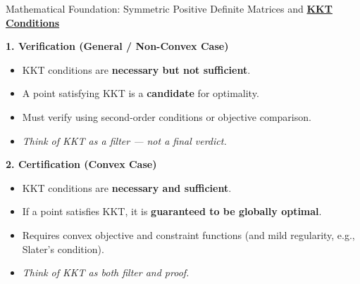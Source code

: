 \documentclass{beamer}
\begin{document}
\begin{frame}{{Mathematical Foundation: Symmetric Positive Definite Matrices and \textbf{\underline{KKT Conditions}}}}

    \textbf{1. Verification (General / Non-Convex Case)}
    \begin{itemize}
        \item KKT conditions are \textbf{necessary but not sufficient}.
        \item A point satisfying KKT is a \textbf{candidate} for optimality.
        \item Must verify using second-order conditions or objective comparison.
        \item \textit{Think of KKT as a filter — not a final verdict.}
    \end{itemize}
    
    \medskip
    
    \textbf{2. Certification (Convex Case)}
    \begin{itemize}
        \item KKT conditions are \textbf{necessary and sufficient}.
        \item If a point satisfies KKT, it is \textbf{guaranteed to be globally optimal}.
        \item Requires convex objective and constraint functions (and mild regularity, e.g., Slater's condition).
        \item \textit{Think of KKT as both filter and proof.}
    \end{itemize}

\end{frame}
\end{document}
